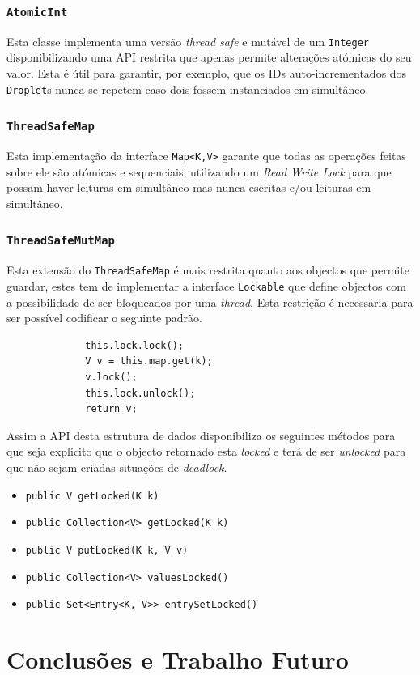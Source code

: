 \documentclass[a4paper]{article}
\begin{document}
\subsubsection{\texttt{AtomicInt}}

Esta classe implementa uma versão \textit{thread safe} e mutável de um \texttt{Integer} disponibilizando uma API restrita que apenas permite alterações atómicas do seu valor. Esta é útil para garantir, por exemplo,  que os IDs auto-incrementados dos \texttt{Droplet}s nunca se repetem  caso dois fossem instanciados em simultâneo.

\subsubsection{\texttt{ThreadSafeMap}}

Esta implementação da interface \texttt{Map<K,V>} garante que todas as operações feitas sobre ele são atómicas e sequenciais, utilizando um \textit{Read Write Lock} para que possam haver leituras em simultâneo mas nunca escritas e/ou leituras em simultâneo.

\subsubsection{\texttt{ThreadSafeMutMap}}

Esta extensão do \texttt{ThreadSafeMap} é mais restrita quanto aos objectos que permite guardar, estes tem de implementar a interface \texttt{Lockable} que define objectos com a possibilidade de ser bloqueados por uma \textit{thread}. Esta restrição é necessária para ser possível codificar o seguinte padrão.

\begin{figure}[H]
    \begin{verbatim}
        this.lock.lock();
        V v = this.map.get(k);
        v.lock();
        this.lock.unlock();
        return v;
    \end{verbatim}
\end{figure}

Assim a API desta estrutura de dados disponibiliza os seguintes métodos para que seja explicito que o objecto retornado esta \textit{locked} e terá de ser \textit{unlocked} para que não sejam criadas situações de \textit{deadlock}.

\begin{itemize}
    \item \texttt{public V getLocked(K k)}
    \item \texttt{public Collection<V> getLocked(K k)}
    \item \texttt{public V putLocked(K k, V v)}
    \item \texttt{public Collection<V> valuesLocked()}
    \item \texttt{public Set<Entry<K, V>> entrySetLocked()}
\end{itemize}

\pagebreak
\section{Conclusões e Trabalho Futuro}
\end{document}

